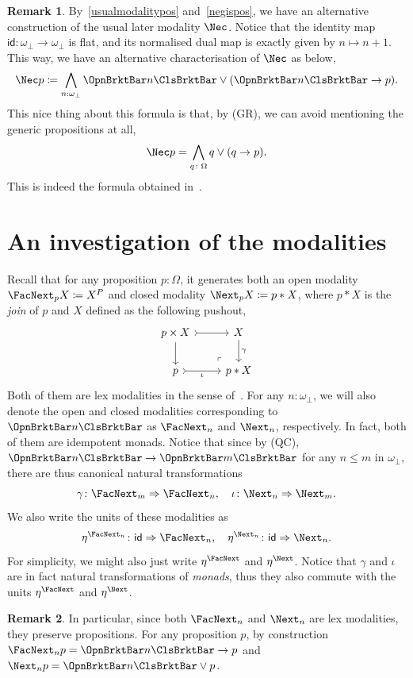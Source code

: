 \documentclass[a4paper,10pt]{amsart}
\theoremstyle{definition}
\newtheorem{remark}{Remark}[section]
\newcommand{\id}{\mathsf{id}}
\newcommand{\nt}{\Rightarrow}
\newcommand{\ass}[1]{\OpnBrktBar#1\ClsBrktBar}
\newcommand{\ovob}{\omega_\bot}
\newcommand{\bbx}{\Nec}
\newcommand{\Prop}{\Omega}
\newcommand{\plo}{\!+\!1}
\newcommand{\opm}[1]{\FacNext_{#1}}
\newcommand{\clm}[1]{\Next_{#1}}
\newcommand{\opmm}{\FacNext}
\newcommand{\clmm}{\Next}
\begin{document}
\begin{remark}\label{canonicalneg}
  By~\cref{usualmodalitypos} and~\cref{negispos}, we have an alternative construction of the usual later modality $\bbx$. Notice that the identity map $\id \colon \ovob\to\ovob$ is flat, and its normalised dual map is exactly given by $n \mapsto n\plo$. This way, we have an alternative characterisation of $\bbx$ as below,
  \[ \bbx p \coloneq \bigwedge_{n:\ovob} \ass n \vee (\ass n \to p). \]
  This nice thing about this formula is that, by (GR), we can avoid mentioning the generic propositions at all,
  \[ \bbx p = \bigwedge_{q\colon\Prop} q \vee (q \to p). \]
  This is indeed the formula obtained in~\cite{ESAKIA200097}.
\end{remark}


\section{An investigation of the modalities}


Recall that for any proposition $p:\Prop$, it generates both an open modality $\opm p X \coloneq X^P$ and closed modality $\clm p X \coloneq p * X$, where $p*X$ is the \emph{join} of $p$ and $X$ defined as the following pushout,
\[\begin{tikzcd}
  {p \times X} & X \\
  p & {p * X}
  \arrow[tail, from=1-1, to=1-2]
  \arrow[from=1-1, to=2-1]
  \arrow["\gamma", from=1-2, to=2-2]
  \arrow["\iota"', tail, from=2-1, to=2-2]
  \arrow["\lrcorner"{anchor=center, pos=0.125, rotate=180}, draw=none, from=2-2, to=1-1]
\end{tikzcd}\]
Both of them are lex modalities in the sense of~\cite{lmcs:3826}. For any $n:\ovob$, we will also denote the open and closed modalities corresponding to $\ass n$ as $\opm n$ and $\clm n$, respectively. In fact, both of them are idempotent monads. Notice that since by (QC), $\ass n \to \ass{m}$ for any $n \le m$ in $\ovob$, there are thus canonical natural transformations 
\[ \gamma \colon \opm{m} \nt \opm{n}, \quad \iota \colon \clm{n} \nt \clm{m}. \]
We also write the units of these modalities as 
\[ \eta^{\opm n} \colon \id \nt \opm n, \quad \eta^{\clm n} \colon \id \nt \clm n. \]
For simplicity, we might also just write $\eta^{\opmm}$ and $\eta^{\clmm}$. Notice that $\gamma$ and $\iota$ are in fact natural transformations of \emph{monads}, thus they also commute with the units $\eta^\opmm$ and $\eta^\clmm$.

\begin{remark}\label{opclpresprop}
  In particular, since both $\opm n$ and $\clm n$ are lex modalities, they preserve propositions. For any proposition $p$, by construction $\opm n p = \ass n \to p$ and $\clm n p = \ass n \vee p$.
\end{remark}
\end{document}
